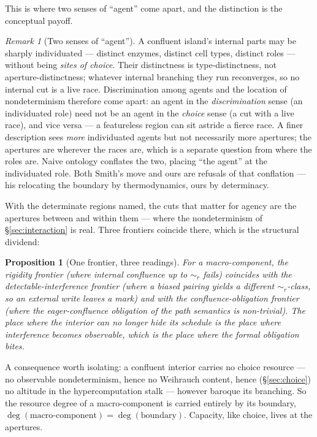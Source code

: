 \documentclass[11pt]{article}
\theoremstyle{definition}
\theoremstyle{plain}
\newtheorem{proposition}{Proposition}
\theoremstyle{remark}
\newtheorem{remark}{Remark}
\newcommand{\rbisim}{\sim_{r}}
\begin{document}
This is where two senses of ``agent'' come apart, and the distinction is the conceptual
payoff.

\begin{remark}[Two senses of ``agent'']\label{rmk:two}
A confluent island's internal parts may be sharply individuated --- distinct enzymes,
distinct cell types, distinct roles --- without being \emph{sites of choice}. Their
distinctness is type-distinctness, not aperture-distinctness; whatever internal branching
they run reconverges, so no internal cut is a live race. Discrimination among agents and
the location of nondeterminism therefore come apart: an agent in the \emph{discrimination}
sense (an individuated role) need not be an agent in the \emph{choice} sense (a cut with a
live race), and vice versa --- a featureless region can sit astride a fierce race. A finer
description sees \emph{more} individuated agents but not necessarily more apertures; the
apertures are wherever the races are, which is a separate question from where the roles
are. Naive ontology conflates the two, placing ``the agent'' at the individuated role.
Both Smith's move and ours are refusals of that conflation --- his relocating the boundary
by thermodynamics, ours by determinacy.
\end{remark}

\noindent
With the determinate regions named, the cuts that matter for agency are the apertures
between and within them --- where the nondeterminism of \S\ref{sec:interaction} is real.
Three frontiers coincide there, which is the structural dividend:

\begin{proposition}[One frontier, three readings]\label{prop:frontier}
For a macro-component, the rigidity frontier (where internal confluence up to
$\rbisim$ fails) coincides with the \emph{detectable-interference frontier} (where a
biased pairing yields a different $\rbisim$-class, so an external write leaves a mark)
and with the \emph{confluence-obligation frontier} (where the eager-confluence
obligation of the path semantics \cite{paths} is non-trivial). The place where the
interior can no longer hide its schedule is the place where interference becomes
observable, which is the place where the formal obligation bites.
\end{proposition}

\noindent
A consequence worth isolating: a confluent interior carries no choice resource --- no
observable nondeterminism, hence no Weihrauch content, hence (\S\ref{sec:choice}) no
altitude in the hypercomputation stalk --- however baroque its branching. So the
resource degree of a macro-component is carried entirely by its boundary,
$\deg(\text{macro-component}) = \deg(\text{boundary})$. Capacity, like choice, lives at
the apertures.
\end{document}

